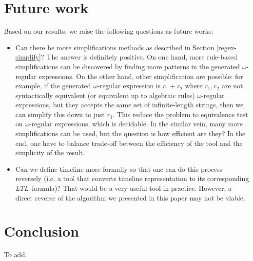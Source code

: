 \documentclass[preprint,12pt]{elsarticle}
\theoremstyle{definition}
\theoremstyle{remark}
\newcommand{\ltl}{\textit{LTL}}
\begin{document}
\section{Future work}
Based on our results, we raise the following questions as future works:
\begin{itemize}
    \item Can there be more simplifications methods as described in Section \ref{regex-simplify}? The answer is definitely positive. On one hand, more rule-based simplifications can be discovered by finding more patterns in the generated $\omega$-regular expressions. On the other hand, other simplification are possible: for example, if the generated $\omega$-regular expression is $r_1 + r_2$ where $r_1, r_2$ are not syntactically equivalent (or equivalent up to algebraic rules) $\omega$-regular expressions, but they accepts the same set of infinite-length strings, then we can simplify this down to just $r_1$. This reduce the problem to equivalence test on $\omega$-regular expressions, which is decidable. In the similar vein, many more simplifications can be used, but the question is how efficient are they? In the end, one have to balance trade-off between the efficiency of the tool and the simplicity of the result.
    \item Can we define timeline more formally so that one can do this process reversely (i.e. a tool that converts timeline representation to its corresponding \ltl\ formula)? That would be a very useful tool in practice. However, a direct reverse of the algorithm we presented in this paper may not be viable.
\end{itemize}

\section{Conclusion}
To add. %



\end{document}
